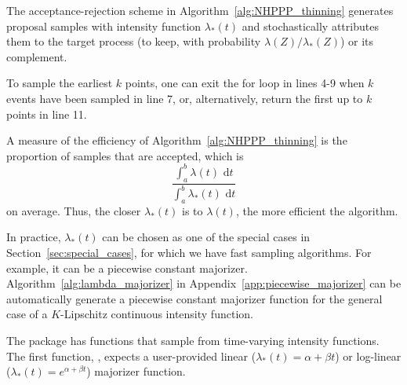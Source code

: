 \documentclass[article,nojss]{jss}\usepackage[]{graphicx}\usepackage[]{xcolor}
\newcommand{\fct}[1]{\code{#1()}}
\begin{document}
The acceptance-rejection scheme in Algorithm~\ref{alg:NHPPP_thinning} generates proposal samples with intensity function $\lambda_*(t)$ and stochastically attributes them to the target process (to keep, with probability $\lambda(Z)/\lambda_*(Z)$) or its complement.



To sample the earliest $k$ points, one can exit the for loop in lines 4-9 when $k$ events have been sampled in line 7, or, alternatively, return the first up to $k$ points in line 11.

A measure of the efficiency of Algorithm~\ref{alg:NHPPP_thinning} is the proportion of samples that are accepted, which is
\begin{equation}\label{eq:thinning-efficiency}
\frac{\int_a^b{\lambda(t) \textrm{ d}t}}{\int_a^b{\lambda_*(t) \textrm{ d}t}}
\end{equation}
on average. Thus, the closer $\lambda_*(t)$ is to $\lambda(t)$, the more efficient the algorithm.

In practice, $\lambda_*(t)$ can be chosen as one of the special cases in Section~\ref{sec:special_cases}, for which we have fast sampling algorithms. For example, it can be a piecewise constant majorizer. Algorithm~\ref{alg:lambda_majorizer} in Appendix~\ref{app:piecewise_majorizer} can be automatically generate a piecewise constant majorizer function for the general case of a $K$-Lipschitz continuous intensity function.

The  package has functions that sample from time-varying intensity functions. The first function, \fct{draw\_intensity}, expects a user-provided linear ($\lambda_*(t) = \alpha + \beta t$) or log-linear ($\lambda_*(t) = e^{\alpha + \beta t}$) majorizer function.
\end{document}
